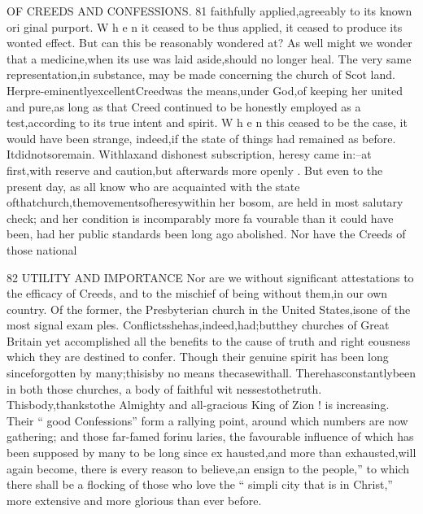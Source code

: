 \documentclass[
]{book}
\begin{document}
OF CREEDS AND CONFESSIONS. 81
faithfully applied,agreeably to its known ori ginal purport. W h e n it ceased to be thus applied, it ceased to produce its wonted effect. But can this be reasonably wondered at? As well might we wonder that a medicine,when its use was laid aside,should no longer heal.
The very same representation,in substance, may be made concerning the church of Scot land. Herpre-eminentlyexcellentCreedwas
the means,under God,of keeping her united
and pure,as long as that Creed continued to
be honestly employed as a test,according to
its true intent and spirit. W h e n this ceased to be the case, it would have been strange,
indeed,if the state of things had remained as before. Itdidnotsoremain. Withlaxand
dishonest subscription, heresy came in:--at first,with reserve and caution,but afterwards more openly . But even to the present day, as all know who are acquainted with the state ofthatchurch,themovementsofheresywithin her bosom, are held in most salutary check; and her condition is incomparably more fa vourable than it could have been, had her public standards been long ago abolished.
Nor have the Creeds of those national

82 UTILITY AND IMPORTANCE
Nor are we without significant attestations to the efficacy of Creeds, and to the mischief
of being without them,in our own country. Of the former, the Presbyterian church in the United States,isone of the most signal exam ples. Conflictsshehas,indeed,had;butthey
churches of Great Britain yet accomplished
all the benefits to the cause of truth and right
eousness which they are destined to confer.
Though their genuine spirit has been long
sinceforgotten by many;thisisby no means thecasewithall. Therehasconstantlybeen
in both those churches, a body of faithful wit nessestothetruth. Thisbody,thankstothe Almighty and all-gracious King of Zion ! is increasing. Their `` good Confessions'' form a rallying point, around which numbers are now gathering; and those far-famed forinu laries, the favourable influence of which has been supposed by many to be long since ex
hausted,and more than exhausted,will again become, there is every reason to believe,an
ensign to the people,'' to which there shall be a flocking of those who love the `` simpli city that is in Christ,'' more extensive and more glorious than ever before.
\end{document}

